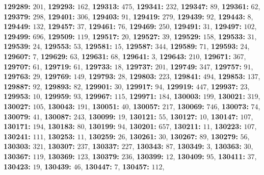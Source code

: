 \textsf{\bfseries 129289:} $201$, \textsf{\bfseries 129293:} $162$, \textsf{\bfseries 129313:} $475$, \textsf{\bfseries 129341:} $232$, \textsf{\bfseries 129347:} $89$, \textsf{\bfseries 129361:} $62$, \textsf{\bfseries 129379:} $298$, \textsf{\bfseries 129401:} $306$, \textsf{\bfseries 129403:} $91$, \textsf{\bfseries 129419:} $279$, \textsf{\bfseries 129439:} $92$, \textsf{\bfseries 129443:} $8$, \textsf{\bfseries 129449:} $132$, \textsf{\bfseries 129457:} $37$, \textsf{\bfseries 129461:} $76$, \textsf{\bfseries 129469:} $250$, \textsf{\bfseries 129491:} $31$, \textsf{\bfseries 129497:} $102$, \textsf{\bfseries 129499:} $696$, \textsf{\bfseries 129509:} $119$, \textsf{\bfseries 129517:} $20$, \textsf{\bfseries 129527:} $39$, \textsf{\bfseries 129529:} $158$, \textsf{\bfseries 129533:} $31$, \textsf{\bfseries 129539:} $24$, \textsf{\bfseries 129553:} $53$, \textsf{\bfseries 129581:} $15$, \textsf{\bfseries 129587:} $344$, \textsf{\bfseries 129589:} $71$, \textsf{\bfseries 129593:} $24$, \textsf{\bfseries 129607:} $7$, \textsf{\bfseries 129629:} $63$, \textsf{\bfseries 129631:} $68$, \textsf{\bfseries 129641:} $3$, \textsf{\bfseries 129643:} $210$, \textsf{\bfseries 129671:} $367$, \textsf{\bfseries 129707:} $61$, \textsf{\bfseries 129719:} $61$, \textsf{\bfseries 129733:} $18$, \textsf{\bfseries 129737:} $201$, \textsf{\bfseries 129749:} $347$, \textsf{\bfseries 129757:} $91$, \textsf{\bfseries 129763:} $29$, \textsf{\bfseries 129769:} $149$, \textsf{\bfseries 129793:} $28$, \textsf{\bfseries 129803:} $223$, \textsf{\bfseries 129841:} $494$, \textsf{\bfseries 129853:} $137$, \textsf{\bfseries 129887:} $92$, \textsf{\bfseries 129893:} $82$, \textsf{\bfseries 129901:} $30$, \textsf{\bfseries 129917:} $94$, \textsf{\bfseries 129919:} $447$, \textsf{\bfseries 129937:} $23$, \textsf{\bfseries 129953:} $10$, \textsf{\bfseries 129959:} $93$, \textsf{\bfseries 129967:} $115$, \textsf{\bfseries 129971:} $184$, \textsf{\bfseries 130003:} $199$, \textsf{\bfseries 130021:} $319$, \textsf{\bfseries 130027:} $105$, \textsf{\bfseries 130043:} $191$, \textsf{\bfseries 130051:} $40$, \textsf{\bfseries 130057:} $217$, \textsf{\bfseries 130069:} $746$, \textsf{\bfseries 130073:} $74$, \textsf{\bfseries 130079:} $41$, \textsf{\bfseries 130087:} $243$, \textsf{\bfseries 130099:} $19$, \textsf{\bfseries 130121:} $55$, \textsf{\bfseries 130127:} $10$, \textsf{\bfseries 130147:} $107$, \textsf{\bfseries 130171:} $194$, \textsf{\bfseries 130183:} $80$, \textsf{\bfseries 130199:} $94$, \textsf{\bfseries 130201:} $657$, \textsf{\bfseries 130211:} $11$, \textsf{\bfseries 130223:} $107$, \textsf{\bfseries 130241:} $111$, \textsf{\bfseries 130253:} $11$, \textsf{\bfseries 130259:} $26$, \textsf{\bfseries 130261:} $30$, \textsf{\bfseries 130267:} $89$, \textsf{\bfseries 130279:} $56$, \textsf{\bfseries 130303:} $321$, \textsf{\bfseries 130307:} $237$, \textsf{\bfseries 130337:} $227$, \textsf{\bfseries 130343:} $87$, \textsf{\bfseries 130349:} $3$, \textsf{\bfseries 130363:} $30$, \textsf{\bfseries 130367:} $119$, \textsf{\bfseries 130369:} $123$, \textsf{\bfseries 130379:} $236$, \textsf{\bfseries 130399:} $12$, \textsf{\bfseries 130409:} $95$, \textsf{\bfseries 130411:} $37$, \textsf{\bfseries 130423:} $19$, \textsf{\bfseries 130439:} $46$, \textsf{\bfseries 130447:} $7$, \textsf{\bfseries 130457:} $112$, 
